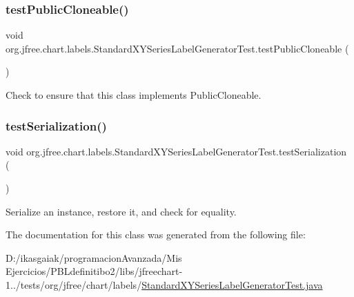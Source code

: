 \subsubsection{\texorpdfstring{test\+Public\+Cloneable()}{testPublicCloneable()}}
{\footnotesize\ttfamily void org.\+jfree.\+chart.\+labels.\+Standard\+X\+Y\+Series\+Label\+Generator\+Test.\+test\+Public\+Cloneable (\begin{DoxyParamCaption}{ }\end{DoxyParamCaption})}

Check to ensure that this class implements Public\+Cloneable. \mbox{\label{classorg_1_1jfree_1_1chart_1_1labels_1_1_standard_x_y_series_label_generator_test_a553f1f393617d0faa05f623b59a55715}} 
\subsubsection{\texorpdfstring{test\+Serialization()}{testSerialization()}}
{\footnotesize\ttfamily void org.\+jfree.\+chart.\+labels.\+Standard\+X\+Y\+Series\+Label\+Generator\+Test.\+test\+Serialization (\begin{DoxyParamCaption}{ }\end{DoxyParamCaption})}

Serialize an instance, restore it, and check for equality. 

The documentation for this class was generated from the following file\+:\begin{DoxyCompactItemize}
\item 
D\+:/ikasgaiak/programacion\+Avanzada/\+Mis Ejercicios/\+P\+B\+Ldefinitibo2/libs/jfreechart-\/1../tests/org/jfree/chart/labels/\mbox{\hyperlink{_standard_x_y_series_label_generator_test_8java}{Standard\+X\+Y\+Series\+Label\+Generator\+Test.\+java}}\end{DoxyCompactItemize}
